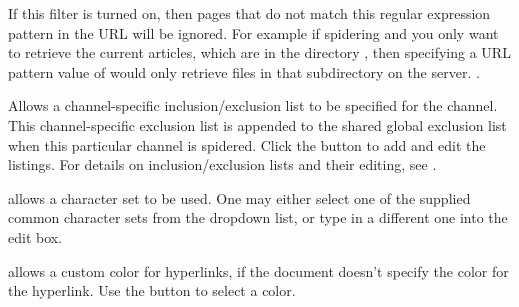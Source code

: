  If this filter is turned on, then pages 
that do not match this regular expression pattern in the URL will be ignored.
For example if spidering  and you only want to retrieve the
current articles, which are in the directory , then 
specifying a URL pattern value of  would only 
retrieve files in that subdirectory on the server. 
.

 Allows a channel-specific 
inclusion/exclusion list to be specified for the channel. 
This channel-specific exclusion list is appended to the shared 
global exclusion list when this particular channel is spidered. 
Click the 
button to add and edit the listings. For details on inclusion/exclusion lists 
and their editing, see 
\helpignore{\ref{sec:pd-exclusion-dialog}}
.


 allows a 
character set to be used. One may either select one of the supplied common 
character sets from the dropdown list, or type in a different one into the 
edit box.


 allows a custom color 
for hyperlinks, if the document doesn't specify the color for the hyperlink. 
Use the  button to select a color. 

